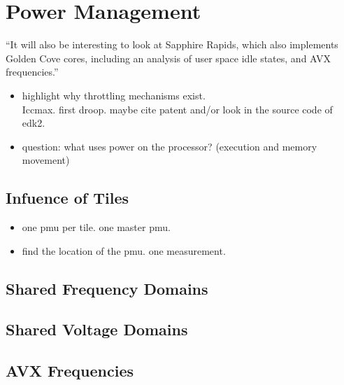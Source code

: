 \chapter{Power Management}
``It will also be interesting to look at Sapphire Rapids, which also implements Golden Cove cores, including an analysis of user space idle states, and AVX frequencies.''


\begin{itemize}
    \item highlight why throttling mechanisms exist.\\
    Iccmax. first droop. maybe cite patent and/or look in the source code of edk2.
    \item question: what uses power on the processor? (execution and memory movement)
\end{itemize}


\section{Infuence of Tiles}
\begin{itemize}
    \item one pmu per tile. one master pmu.
    \item find the location of the pmu. one measurement.
\end{itemize}

\section{Shared Frequency Domains}


\section{Shared Voltage Domains}

\section{AVX Frequencies}


